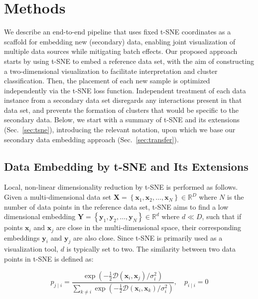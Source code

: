 \documentclass[runningheads]{llncs}
\begin{document}
\section{Methods}

We describe an end-to-end pipeline that uses fixed t-SNE coordinates as a
scaffold for embedding new (secondary) data, enabling joint visualization of
multiple data sources while mitigating batch effects. Our proposed approach
starts by using t\nobreakdash -SNE to embed a reference data set, with the aim
of constructing a two-dimensional visualization to facilitate interpretation
and cluster classification. Then, the placement of each new sample is optimized
independently via the t\nobreakdash -SNE loss function. Independent treatment
of each data instance from a secondary data set disregards any interactions
present in that data set, and prevents the formation of clusters that would be
specific to the secondary data. Below, we start with a summary of t-SNE and its
extensions (Sec.~\ref{sec:tsne}), introducing the relevant notation, upon which
we base our secondary data embedding approach (Sec.~\ref{sec:transfer}).


\subsection{Data Embedding by t-SNE and Its Extensions\label{sec:tsne}}

Local, non-linear dimensionality reduction by t-SNE is performed as follows.
Given a multi-dimensional data set $\mathbf{X} = \left \{ \mathbf{x}_1,
\mathbf{x}_2, \dots, \mathbf{x}_N \right \} \in \mathbb{R}^D$ where $N$ is the
number of data points in the reference data set, t-SNE aims to find a low
dimensional embedding $\mathbf{Y} = \left \{ \mathbf{y}_1, \mathbf{y}_2, \dots,
\mathbf{y}_N \right \} \in \mathbb{R}^d$ where $d \ll D$, such that if points
$\mathbf{x}_i$ and $\mathbf{x}_j$ are close in the multi-dimensional space,
their corresponding embeddings $\mathbf{y}_i$ and $\mathbf{y}_j$ are also
close. Since t-SNE is primarily used as a visualization tool, $d$ is typically
set to two. The similarity between two data points in t-SNE is defined as:

\begin{equation}
p_{j \mid i} = \frac{\exp \left ( -\frac{1}{2} \mathcal{D}(\mathbf{x}_i, \mathbf{x}_j ) / \sigma_i^2 \right )}
{\sum_{k \neq i } \exp \left ( -\frac{1}{2} \mathcal{D}(\mathbf{x}_i, \mathbf{x}_k ) / \sigma_i^2 \right )}, \quad p_{i \mid i} = 0
\label{eq:gaussian_kernel}
\end{equation}
\end{document}
